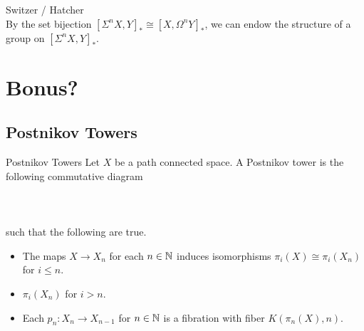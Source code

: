 \documentclass[a4paper]{article}
\begin{document}
Switzer / Hatcher\\

By the set bijection $[\Sigma^nX,Y]_\ast\cong[X,\Omega^nY]_\ast$, we can endow the structure of a group on $[\Sigma^nX,Y]_\ast$. 


\pagebreak
\section{Bonus?}
\subsection{Postnikov Towers}
\begin{defn}{Postnikov Towers}{} Let $X$ be a path connected space. A Postnikov tower is the following commutative diagram \\~\\
\\~\\
such that the following are true. 
\begin{itemize}
\item The maps $X\to X_n$ for each $n\in\mathbb{N}$ induces isomorphisms $\pi_i(X)\cong\pi_i(X_n)$ for $i\leq n$. 
\item $\pi_i(X_n)$ for $i>n$. 
\item Each $p_n:X_n\to X_{n-1}$ for $n\in\mathbb{N}$ is a fibration with fiber $K(\pi_n(X),n)$. 
\end{itemize}
\end{defn}
\end{document}
